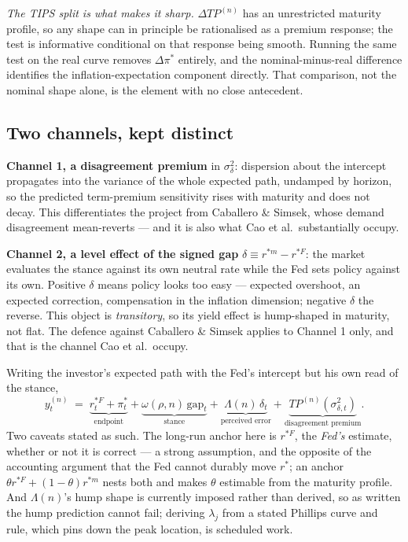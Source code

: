 \documentclass[11pt]{article}
\newcommand{\rs}{$r^{*}$}
\begin{document}
\emph{The TIPS split is what makes it sharp.} $\Delta TP^{(n)}$ has an unrestricted maturity
profile, so any shape can in principle be rationalised as a premium response; the test is
informative conditional on that response being smooth. Running the same test on the real curve
removes $\Delta\pi^{*}$ entirely, and the nominal-minus-real difference identifies the
inflation-expectation component directly. That comparison, not the nominal shape alone, is the
element with no close antecedent.

\subsection{Two channels, kept distinct}

\textbf{Channel 1, a disagreement premium} in $\sigma^2_{\delta}$: dispersion about the intercept
propagates into the variance of the whole expected path, undamped by horizon, so the predicted
term-premium sensitivity rises with maturity and does not decay. This differentiates the project
from Caballero \& Simsek, whose demand disagreement mean-reverts --- and it is also what Cao
et al.\ substantially occupy.

\textbf{Channel 2, a level effect of the signed gap} $\delta \equiv r^{*m} - r^{*F}$: the market
evaluates the stance against its own neutral rate while the Fed sets policy against its own.
Positive $\delta$ means policy looks too easy --- expected overshoot, an expected correction,
compensation in the inflation dimension; negative $\delta$ the reverse. This object is
\emph{transitory}, so its yield effect is hump-shaped in maturity, not flat. The defence against Caballero \& Simsek
applies to Channel 1 only, and that is the channel Cao et al.\ occupy.

Writing the investor's expected path with the Fed's intercept but his own read of the stance,
\begin{equation}
y^{(n)}_t \;=\; \underbrace{r^{*F}_t + \pi^{*}_t}_{\text{endpoint}} + \underbrace{\omega(\rho,n)\,\text{gap}_t}_{\text{stance}} + \underbrace{\Lambda(n)\,\delta_t}_{\text{perceived error}} + \underbrace{TP^{(n)}\!\left(\sigma^2_{\delta,t}\right)}_{\text{disagreement premium}} .
\label{eq:pricing}
\end{equation}
Two caveats stated as such. The long-run anchor here is $r^{*F}$, the \emph{Fed's} estimate,
whether or not it is correct --- a strong assumption, and the opposite of the accounting
argument that the Fed cannot durably move \rs{}; an anchor
$\theta r^{*F} + (1-\theta)r^{*m}$ nests both and makes $\theta$ estimable from the maturity
profile. And $\Lambda(n)$'s hump shape is currently imposed rather than derived, so as written
the hump prediction cannot fail; deriving $\lambda_j$ from a stated Phillips curve and rule,
which pins down the peak location, is scheduled work.
\end{document}
